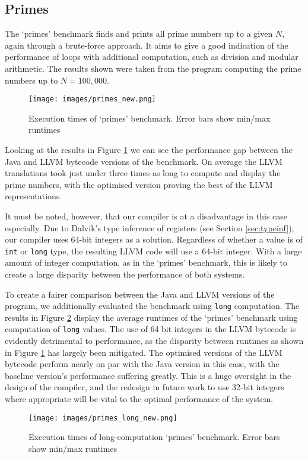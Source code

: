 \subsection*{Primes}

The `primes' benchmark finds and prints all prime numbers up to a given $N$, again through a brute-force approach. It aims to give a good indication of the performance of loops with additional computation, such as division and modular arithmetic. The results shown were taken from the program computing the prime numbers up to $N = 100,000$.

\begin{figure}[h!]
    \centering
    \texttt{[image: images/primes\_new.png]}
    \caption[Execution times of `primes' benchmark]{Execution times of `primes' benchmark. Error bars show min/max runtimes}
    \label{fig:res_primes}
\end{figure}

Looking at the results in Figure \ref{fig:res_primes} we can see the performance gap between the Java and LLVM bytecode versions of the benchmark. On average the LLVM translations took just under three times as long to compute and display the prime numbers, with the optimised version proving the best of the LLVM representations.

It must be noted, however, that our compiler is at a disadvantage in this case especially. Due to Dalvik's type inference of registers (see Section \ref{sec:typeinf}), our compiler uses 64-bit integers as a solution. Regardless of whether a value is of \verb|int| or \verb|long| type, the resulting LLVM code will use a 64-bit integer. With a large amount of integer computation, as in the `primes' benchmark, this is likely to create a large disparity between the performance of both systems.

To create a fairer comparison between the Java and LLVM versions of the program, we additionally evaluated the benchmark using \verb|long| computation. The results in Figure \ref{fig:res_primes_long} display the average runtimes of the `primes' benchmark using computation of \verb|long| values. The use of 64 bit integers in the LLVM bytecode is evidently detrimental to performance, as the disparity between runtimes as shown in Figure \ref{fig:res_primes} has largely been mitigated. The optimised versions of the LLVM bytecode perform nearly on par with the Java version in this case, with the baseline version's performance suffering greatly. This is a huge oversight in the design of the compiler, and the redesign in future work to use 32-bit integers where appropriate will be vital to the optimal performance of the system.

\begin{figure}[h!]
    \centering
    \texttt{[image: images/primes\_long\_new.png]}
    \caption[Execution times of long-computation `primes' benchmark]{Execution times of long-computation `primes' benchmark. Error bars show min/max runtimes}
    \label{fig:res_primes_long}
\end{figure}
